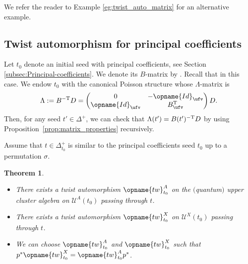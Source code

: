 \documentclass[pdftex]{sigma}
\renewcommand{\tw}{\opname{tw}}
\newcommand{\upClAlg}{\mathcal{U}^A}
\newcommand{\XClAlg}{\mathcal{U}^X}
\newcommand{\Id}{{\opname{Id}}}
\renewcommand{\tw}{\opname{tw}}
\numberwithin{equation}{section}
\newtheorem{Theorem}{Theorem}[section]
\begin{document}
We refer the reader to Example \ref{eg:twist_auto_matrix} for an
alternative example.

\subsection{Twist automorphism for principal coefficients\label{subsec:Cluster-twist-automorphism-principal}}

Let $t_{0}$ denote an initial seed with principal coefficients, see
Section \ref{subsec:Principal-coefficients}. We denote its $B$-matrix
by \smash{$B=\left(\begin{smallmatrix}
B_{\ufv} & -\Id_{\ufv}\\
\Id_{\ufv} & 0
\end{smallmatrix}\right)$}. Recall that  in this case. We endow $t_{0}$ with the canonical Poisson structure whose $\Lambda$-matrix is
\[
\Lambda:= B^{\rm -T}D=\left(\begin{matrix}
0 & -\Id_{\ufv}\\
\Id_{\ufv} & B_{\ufv}^{\rm T}
\end{matrix}\right)D.
\] Then, for any seed $t'\in\Delta^{+}$, we can check
that $\Lambda(t')= B(t')^{\rm -T}D$ by using Proposition~\ref{prop:matrix_properties}
recursively.

Assume that $t\in\Delta_{t_0}^{+}$ is similar to the principal coefficients
seed $t_{0}$ up to a permutation $\sigma$.

\begin{Theorem}\label{thm:twist_principal_coeff}\quad
\begin{itemize}\itemsep=0pt
\item[$(1)$] There exists a twist automorphism $\tw_{t_{0}}^{A}$ on the $($quantum$)$ upper cluster algebra on
$\upClAlg(t_{0})$ passing through $t$.
\item[$(2)$] There exists a twist automorphism $\tw_{t_{0}}^{X}$ on
$\XClAlg(t_{0})$ passing through $t$.
\item[$(3)$] We can choose $\tw_{t_{0}}^{A}$ and $\tw_{t_{0}}^{X}$ such that
$p^{*}\tw_{t_{0}}^{X}=\tw_{t_{0}}^{A}p^{*}$.
\end{itemize}
\end{Theorem}
\end{document}
